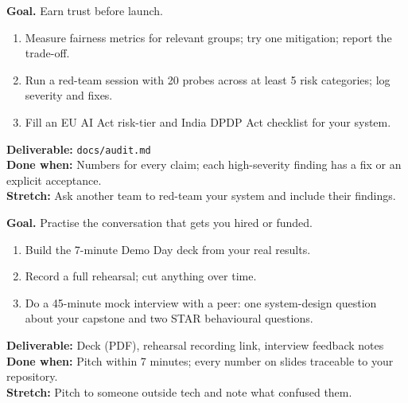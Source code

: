 \begin{tcolorbox}[enhanced,breakable,colback=white,colframe=sun,boxrule=0.8pt,arc=2pt,left=7pt,right=7pt,top=4pt,bottom=4pt,
  title={\bfseries Thursday --- Fairness, red-team and compliance audit\hfill\normalfont\small 3 h},coltitle=white,colbacktitle=sun,fonttitle=\small]
\textbf{Goal.} Earn trust before launch.
\begin{enumerate}[itemsep=1pt,topsep=2pt]
  \item Measure fairness metrics for relevant groups; try one mitigation; report the trade-off.
  \item Run a red-team session with 20 probes across at least 5 risk categories; log severity and fixes.
  \item Fill an EU AI Act risk-tier and India DPDP Act checklist for your system.
\end{enumerate}
\textbf{\color{dataC}Deliverable:} \texttt{docs/audit.md}\\
\textbf{\color{navy}Done when:} Numbers for every claim; each high-severity finding has a fix or an explicit acceptance.\\
\textbf{\color{skillC}Stretch:} Ask another team to red-team your system and include their findings.
\end{tcolorbox}

\begin{tcolorbox}[enhanced,breakable,colback=white,colframe=sun,boxrule=0.8pt,arc=2pt,left=7pt,right=7pt,top=4pt,bottom=4pt,
  title={\bfseries Friday --- Pitch and interview rehearsal\hfill\normalfont\small 3 h},coltitle=white,colbacktitle=sun,fonttitle=\small]
\textbf{Goal.} Practise the conversation that gets you hired or funded.
\begin{enumerate}[itemsep=1pt,topsep=2pt]
  \item Build the 7-minute Demo Day deck from your real results.
  \item Record a full rehearsal; cut anything over time.
  \item Do a 45-minute mock interview with a peer: one system-design question about your capstone and two STAR behavioural questions.
\end{enumerate}
\textbf{\color{dataC}Deliverable:} Deck (PDF), rehearsal recording link, interview feedback notes\\
\textbf{\color{navy}Done when:} Pitch within 7 minutes; every number on slides traceable to your repository.\\
\textbf{\color{skillC}Stretch:} Pitch to someone outside tech and note what confused them.
\end{tcolorbox}

